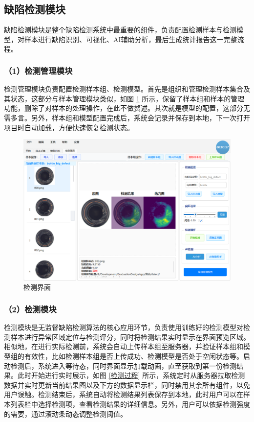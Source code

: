 \documentclass[
  ]{njuthesis}
\begin{document}
\subsection{缺陷检测模块}

缺陷检测模块是整个缺陷检测系统中最重要的组件，负责配置检测样本与检测模型，对样本进行缺陷识别、可视化、AI辅助分析，最后生成统计报告这一完整流程。

\subsubsection{（1）检测管理模块}

检测管理模块负责配置检测样本组、检测模型。首先是组织和管理检测样本集合及其状态，这部分与样本管理模块类似，如图 \ref{检测界面} 所示，保留了样本组和样本的管理功能，删除了对样本的处理操作，在此不做赘述。其次就是模型的配置，这部分无需多言。另外，样本组和模型配置完成后，系统会记录并保存到本地，下一次打开项目时自动加载，方便快速恢复检测状态。

\begin{figure}[htb]
    \centering
    \includegraphics[width=\textwidth]{images/检测界面.png}
    \caption{检测界面}
    \label{检测界面}
\end{figure}

\subsubsection{（2）检测模块}

检测模块是无监督缺陷检测算法的核心应用环节，负责使用训练好的检测模型对检测样本进行异常区域定位与检测评分，同时将检测结果实时显示在界面预览区域。相似地，在进行实际检测前，系统会自动上传样本组至服务器，并验证样本组和模型组的有效性，比如检测样本组是否上传成功、检测模型是否处于空闲状态等。启动检测后，系统进入等待态，同时界面显示加载动画，直至获取到第一份检测结果。此时开始进行实时展示，如图 \ref{检测过程} 所示，系统定时从服务器拉取检测数据并实时更新当前结果图以及下方的数据显示栏，同时禁用其余所有组件，以免用户误触。检测结束后，系统自动将检测结果列表保存到本地，此时用户可以在样本列表栏中选择检测项，查看检测结果的详细信息。另外，用户可以依据检测强度的需要，通过滚动条动态调整检测阈值。
\end{document}
